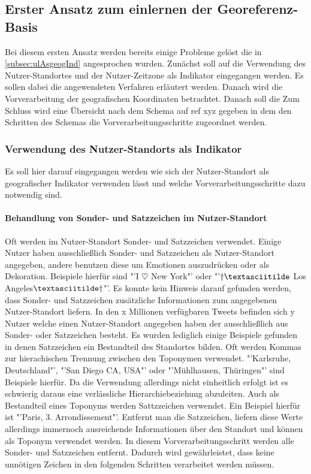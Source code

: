 				\subsection{Erster Ansatz zum einlernen der Georeferenz-Basis}

					Bei diesem ersten Ansatz werden bereits einige Probleme gelöst die in \ref{subsec:ulAsgeogInd} angesprochen wurden. 
					Zunächst soll auf die Verwendung des Nutzer-Standortes und der Nutzer-Zeitzone als Indikator eingegangen werden.
					Es sollen dabei die angewendeten Verfahren erläutert werden.
					Danach wird die Vorverarbeitung der geografischen Koordinaten betrachtet.
					Danach soll die 
					Zum Schluss wird eine Übersicht nach dem Schema auf ref xyz gegeben in dem den Schritten des Schemas die Vorverarbeitungsschritte zugeordnet werden. 



					\subsubsection{Verwendung des Nutzer-Standorts als Indikator}

					Es soll hier darauf eingegangen werden wie sich der Nutzer-Standort als geografischer Indikator verwenden lässt und welche Vorverarbeitungsschritte dazu notwendig sind. 

					\paragraph{Behandlung von Sonder- und Satzzeichen im Nutzer-Standort} 
						Oft werden im Nutzer-Standort Sonder- und Satzzeichen verwendet. 
						Einige Nutzer haben ausschließlich Sonder- und Satzzeichen als Nutzer-Standort angegeben, andere benutzen diese um Emotionen auszudrücken oder als Dekoration. 
						Beispiele hierfür sind "'I $\heartsuit$ New York"' oder "'$\dagger\textasciitilde$ Los Angeles$\textasciitilde\dagger$"'.
						Es konnte kein Hinweis darauf gefunden werden, dass Sonder- und Satzzeichen zusätzliche Informationen zum angegebenen Nutzer-Standort liefern. 
						In den x Millionen verfügbaren Tweets befinden sich y Nutzer welche einen Nutzer-Standort angegeben haben der ausschließlich aus Sonder- oder Satzzeichen besteht. 
						Es wurden lediglich einige Beispiele gefunden in denen Satzzeichen ein Bestandteil des Standortes bilden.
						Oft werden Kommas zur hierachischen Trennung zwischen den Toponymen verwendet.
						"'Karlsruhe, Deutschland"', "'San Diego CA, USA"' oder "'Mühlhausen, Thüringen"' sind Beispiele hierfür.
						Da die Verwendung allerdings nicht einheitlich erfolgt ist es schwierig daraus eine verlässliche Hierarchiebeziehung abzuleiten.
						Auch als Bestandteil eines Toponyms werden Sattzzeichen verwendet.
						Ein Beispiel hierfür ist "'Paris, 3. Arrondissement"'.
						Entfernt man die Satzzeichen, liefern diese Werte allerdings immernoch ausreichende Informationen über den Standort und können als Toponym verwendet werden.  
						In diesem Vorverarbeitungsschritt werden alle Sonder- und Satzzeichen entfernt. 
						Dadurch wird gewährleistet, dass keine unnötigen Zeichen in den folgenden Schritten verarbeitet werden müssen. 


